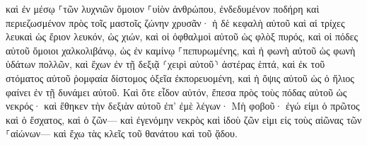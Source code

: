 \documentclass{openreader}
\begin{document}
καὶ ἐν μέσῳ ⸀τῶν λυχνιῶν ὅμοιον ⸀υἱὸν ἀνθρώπου, ἐνδεδυμένον ποδήρη καὶ περιεζωσμένον πρὸς τοῖς μαστοῖς ζώνην χρυσᾶν· 
ἡ δὲ κεφαλὴ αὐτοῦ καὶ αἱ τρίχες λευκαὶ ὡς ἔριον λευκόν, ὡς χιών, καὶ οἱ ὀφθαλμοὶ αὐτοῦ ὡς φλὸξ πυρός, 
καὶ οἱ πόδες αὐτοῦ ὅμοιοι χαλκολιβάνῳ, ὡς ἐν καμίνῳ ⸀πεπυρωμένης, καὶ ἡ φωνὴ αὐτοῦ ὡς φωνὴ ὑδάτων πολλῶν, 
καὶ ἔχων ἐν τῇ δεξιᾷ ⸂χειρὶ αὐτοῦ⸃ ἀστέρας ἑπτά, καὶ ἐκ τοῦ στόματος αὐτοῦ ῥομφαία δίστομος ὀξεῖα ἐκπορευομένη, καὶ ἡ ὄψις αὐτοῦ ὡς ὁ ἥλιος φαίνει ἐν τῇ δυνάμει αὐτοῦ. 
Καὶ ὅτε εἶδον αὐτόν, ἔπεσα πρὸς τοὺς πόδας αὐτοῦ ὡς νεκρός· καὶ ἔθηκεν τὴν δεξιὰν αὐτοῦ ἐπ’ ἐμὲ λέγων· Μὴ φοβοῦ· ἐγώ εἰμι ὁ πρῶτος καὶ ὁ ἔσχατος, 
καὶ ὁ ζῶν— καὶ ἐγενόμην νεκρὸς καὶ ἰδοὺ ζῶν εἰμι εἰς τοὺς αἰῶνας τῶν ⸀αἰώνων— καὶ ἔχω τὰς κλεῖς τοῦ θανάτου καὶ τοῦ ᾅδου. 
\end{document}
